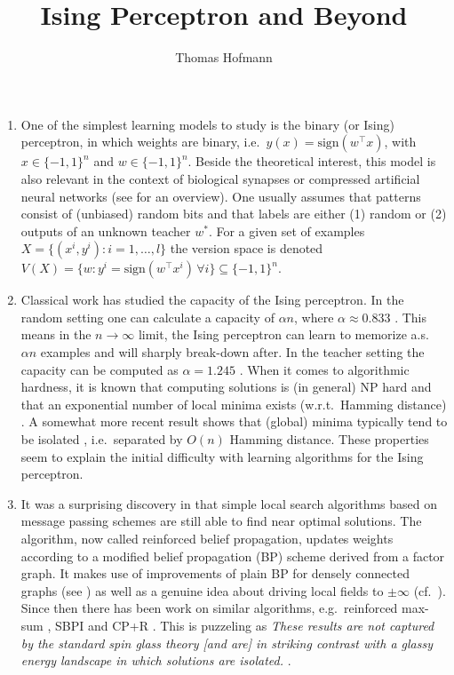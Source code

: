 \documentclass[10pt,a4paper]{article}
\author{Thomas Hofmann}
\title{Ising Perceptron and Beyond}
\begin{document}
\maketitle

\begin{enumerate}
\item
One of the simplest learning models to study is the binary (or Ising) perceptron, in which weights are binary, i.e.~$y(x) = \text{sign}\left( w^\top x \right)$, with  $x \in \{-1,1\}^n$ and $w \in \{-1,1\}^n$.
Beside the theoretical interest, this model is also relevant in the context of biological synapses or compressed artificial neural networks (see \cite{baldassi2015subdominant} for an overview). One usually assumes that patterns consist of (unbiased) random bits and that labels are either (1) random or (2) outputs of an unknown teacher $w^*$. For a given set of examples $X= \{(x^i,y^i): i=1,\dots,l\}$ the version space is denoted $V(X) = \{ w: y^i = \text{sign}\left( w^\top x^i \right)\, \forall i\} \subseteq \{-1,1\}^n$. %
\item 
Classical work has studied the capacity of the Ising perceptron. In the random setting one can calculate a capacity of $\alpha n$, where $\alpha \approx 0.833$ \cite{krauth1989storage}. This means in the $n \to \infty$ limit, the Ising perceptron can learn to memorize a.s.~$\alpha n$ examples and will sharply break-down after. In the teacher setting the capacity can be computed as $\alpha = 1.245$ \cite{sompolinsky1990learning}. When it comes to algorithmic hardness, it is known that computing solutions is (in general) NP hard and that an exponential number of local minima  exists (w.r.t.~Hamming distance) \cite{sompolinsky1990learning}. A somewhat more recent result shows that (global) minima typically tend to be isolated \cite{huang2014origin}, i.e.~separated by $O(n)$ Hamming distance. These properties seem to explain the initial difficulty with learning algorithms for the Ising perceptron. 
\item 
It was a surprising discovery in \cite{braunstein2006learning} that simple local search algorithms based on message passing schemes are still able to find near optimal solutions. The algorithm, now called reinforced belief propagation, updates weights according to a modified belief propagation (BP) scheme derived from a factor graph. It makes use of improvements of plain BP for densely connected graphs (see \cite{kabashima2003cdma,neirotti2005improved}) as well as a genuine idea about driving local fields to $\pm \infty$ (cf.~\cite[Eqs.~(4,5)]{braunstein2006learning}). Since then there has been work on similar algorithms, e.g.~reinforced max-sum \cite{baldassi2015max}, SBPI \cite{baldassi2007efficient} and CP+R \cite{baldassi2009generalization}. This is puzzeling as \textit{These results are not captured by the standard spin glass theory [and are] in striking contrast with a glassy energy landscape in which solutions are isolated.} \cite{baldassi2015subdominant}.

\end{enumerate}
\end{document}
